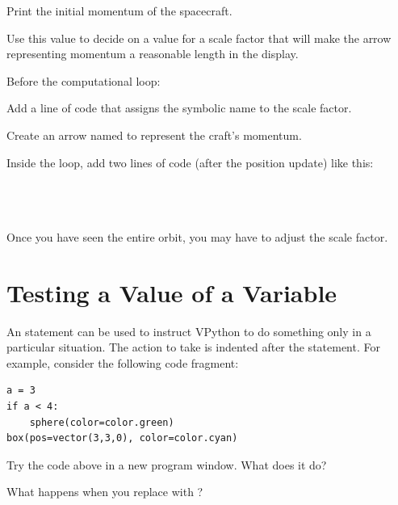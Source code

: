 \documentclass[11pt]{article}
\begin{document}
\begin{compactitem}[\color{MIRed}$\Rightarrow$]
\item Print the initial momentum of the spacecraft. 
\item Use this value to decide on a value for a scale factor that will make the arrow representing momentum a reasonable length in the display.
\item Before the computational loop:
\begin{compactitem}[\color{MIRed}$\Rightarrow$]
\item Add a line of code that assigns the symbolic name  to the scale factor.   
\item Create an arrow named  to represent the craft's momentum.
\end{compactitem}
\item Inside the loop, add two lines of code (after the position update) like this:\\\\
\hspace{20pt}\\
\hspace{20pt}\\

\item Once you have seen the entire orbit, you may have to adjust the scale factor.
\end{compactitem}

\section{Testing a Value of a Variable}

An  statement can be used to instruct VPython to do something only in a particular situation.  The action to take is indented after the  statement.  For example, consider the following code fragment:

\color{CodeColor}
\begin{Verbatim}[frame=single]
a = 3
if a < 4:
    sphere(color=color.green)
box(pos=vector(3,3,0), color=color.cyan)
\end{Verbatim}
\color{black}

\begin{compactitem}[\color{MIRed}$\Rightarrow$]
\item Try the code above in a new program window.  What does it do?   
\item What happens when you replace  with ?
\end{compactitem}
\end{document}
